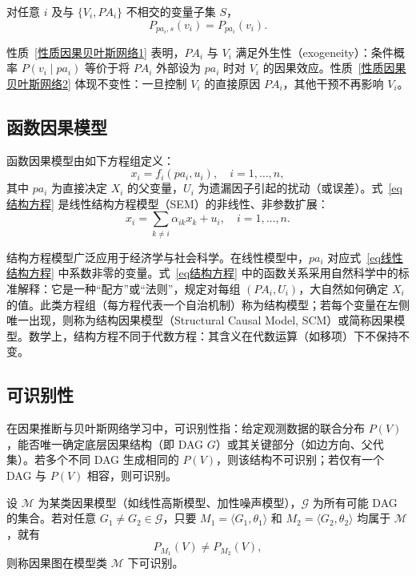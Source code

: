 \begin{proposition}
	\label{性质因果贝叶斯网络2}
	对任意 $i$ 及与 $\{V_i, PA_i\}$ 不相交的变量子集 $S$，
	\begin{equation}
		P_{pa_i, s}(v_i) = P_{pa_i}(v_i).
	\end{equation}
\end{proposition}

性质~\ref{性质因果贝叶斯网络1} 表明，$PA_i$ 与 $V_i$ 满足外生性（exogeneity）：条件概率 $P(v_i \mid pa_i)$ 等价于将 $PA_i$ 外部设为 $pa_i$ 时对 $V_i$ 的因果效应。性质~\ref{性质因果贝叶斯网络2} 体现不变性：一旦控制 $V_i$ 的直接原因 $PA_i$，其他干预不再影响 $V_i$。

\subsection{函数因果模型}

函数因果模型由如下方程组定义：
\begin{equation}
	\label{eq结构方程}
	x_i = f_i(pa_i, u_i), \quad i=1,\dots,n,
\end{equation}
其中 $pa_i$ 为直接决定 $X_i$ 的父变量，$U_i$ 为遗漏因子引起的扰动（或误差）。式~\ref{eq结构方程} 是线性结构方程模型（SEM）的非线性、非参数扩展：
\begin{equation}
	\label{eq线性结构方程}
	x_i = \sum_{k \ne i} \alpha_{ik} x_k + u_i, \quad i=1,\dots,n.
\end{equation}

结构方程模型广泛应用于经济学与社会科学。在线性模型中，$pa_i$ 对应式~\ref{eq线性结构方程} 中系数非零的变量。式~\ref{eq结构方程} 中的函数关系采用自然科学中的标准解释：它是一种“配方”或“法则”，规定对每组 $(PA_i, U_i)$，大自然如何确定 $X_i$ 的值。此类方程组（每方程代表一个自治机制）称为结构模型；若每个变量在左侧唯一出现，则称为结构因果模型（Structural Causal Model, SCM）或简称因果模型。数学上，结构方程不同于代数方程：其含义在代数运算（如移项）下不保持不变。

\subsection{可识别性}
\label{sec:identifiability}

在因果推断与贝叶斯网络学习中，可识别性指：给定观测数据的联合分布 $P(V)$，能否唯一确定底层因果结构（即 DAG $G$）或其关键部分（如边方向、父代集）。若多个不同 DAG 生成相同的 $P(V)$，则该结构不可识别；若仅有一个 DAG 与 $P(V)$ 相容，则可识别。

\begin{definition}[可识别性]
	设 $\mathcal{M}$ 为某类因果模型（如线性高斯模型、加性噪声模型），$\mathcal{G}$ 为所有可能 DAG 的集合。若对任意 $G_1 \ne G_2 \in \mathcal{G}$，只要 $M_1 = \langle G_1, \theta_1 \rangle$ 和 $M_2 = \langle G_2, \theta_2 \rangle$ 均属于 $\mathcal{M}$，就有
	\[
	P_{M_1}(V) \neq P_{M_2}(V),
	\]
	则称因果图在模型类 $\mathcal{M}$ 下可识别。
\end{definition}

